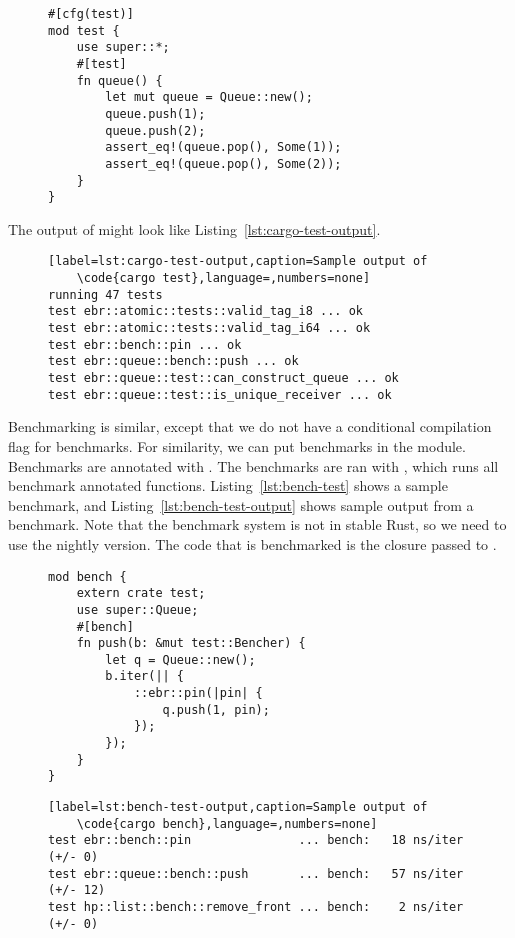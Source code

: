 \documentclass[b5paper]{report}
\begin{document}
\begin{appendices}
  \begin{figure}[ht]
  \begin{lstlisting}[label=lst:cargo-test,caption=An example test in Rust]
#[cfg(test)]
mod test {
    use super::*;
    #[test]
    fn queue() {
        let mut queue = Queue::new();
        queue.push(1);
        queue.push(2);
        assert_eq!(queue.pop(), Some(1));
        assert_eq!(queue.pop(), Some(2));
    }
}
    \end{lstlisting}
  \end{figure}
  The output of  might look like
  Listing~\ref{lst:cargo-test-output}.
  \begin{figure}[ht]
    \begin{lstlisting}[label=lst:cargo-test-output,caption=Sample output of
    \code{cargo test},language=,numbers=none]
running 47 tests
test ebr::atomic::tests::valid_tag_i8 ... ok
test ebr::atomic::tests::valid_tag_i64 ... ok
test ebr::bench::pin ... ok
test ebr::queue::bench::push ... ok
test ebr::queue::test::can_construct_queue ... ok
test ebr::queue::test::is_unique_receiver ... ok
    \end{lstlisting}
  \end{figure}

  Benchmarking is similar, except that we do not have a conditional compilation
  flag for benchmarks. For similarity, we can put benchmarks in the 
  module. Benchmarks are annotated with \code{\#[bench]}. The benchmarks are ran
  with , which runs all benchmark annotated functions.
  Listing~\ref{lst:bench-test} shows a sample benchmark, and
  Listing~\ref{lst:bench-test-output} shows sample output from a benchmark.
  Note that the benchmark system is not in stable Rust, so we need to use the
  nightly version. The code that is benchmarked is the closure passed to
  .

  \begin{figure}[ht]
  \begin{lstlisting}[label=lst:bench-test,caption=An example benchmark in Rust]
mod bench {
    extern crate test;
    use super::Queue;
    #[bench]
    fn push(b: &mut test::Bencher) {
        let q = Queue::new();
        b.iter(|| {
            ::ebr::pin(|pin| {
                q.push(1, pin);
            });
        });
    }
}
    \end{lstlisting}
  \end{figure}
  \begin{figure}[ht]
    \begin{lstlisting}[label=lst:bench-test-output,caption=Sample output of
    \code{cargo bench},language=,numbers=none]
test ebr::bench::pin               ... bench:   18 ns/iter (+/- 0)
test ebr::queue::bench::push       ... bench:   57 ns/iter (+/- 12)
test hp::list::bench::remove_front ... bench:    2 ns/iter (+/- 0)
    \end{lstlisting}
  \end{figure}



\end{appendices}
\end{document}
